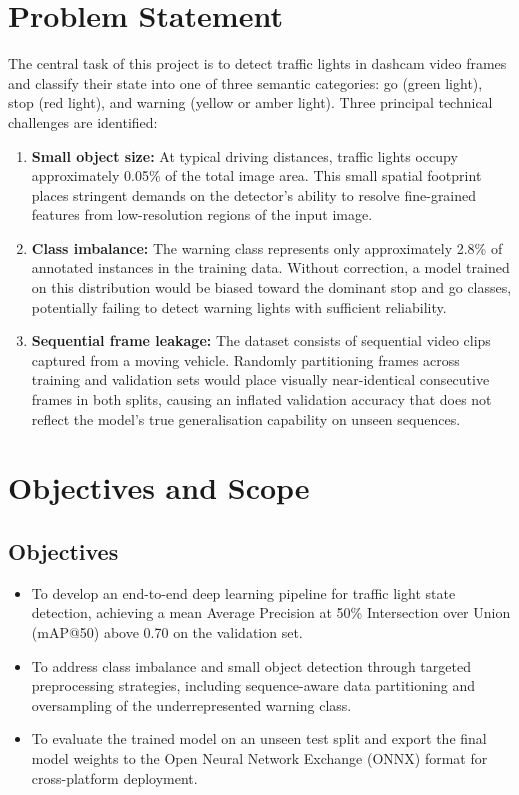 \section{Problem Statement}

The central task of this project is to detect traffic lights in dashcam video frames and classify their state into one of three semantic categories: go (green light), stop (red light), and warning (yellow or amber light). Three principal technical challenges are identified:

\begin{enumerate}
    \item \textbf{Small object size:} At typical driving distances, traffic lights occupy approximately 0.05\% of the total image area. This small spatial footprint places stringent demands on the detector's ability to resolve fine-grained features from low-resolution regions of the input image.
    \item \textbf{Class imbalance:} The warning class represents only approximately 2.8\% of annotated instances in the training data. Without correction, a model trained on this distribution would be biased toward the dominant stop and go classes, potentially failing to detect warning lights with sufficient reliability.
    \item \textbf{Sequential frame leakage:} The dataset consists of sequential video clips captured from a moving vehicle. Randomly partitioning frames across training and validation sets would place visually near-identical consecutive frames in both splits, causing an inflated validation accuracy that does not reflect the model's true generalisation capability on unseen sequences.
\end{enumerate}

\section{Objectives and Scope}

\subsection{Objectives}

\begin{itemize}
    \item To develop an end-to-end deep learning pipeline for traffic light state detection, achieving a mean Average Precision at 50\% Intersection over Union (mAP@50) above 0.70 on the validation set.
    \item To address class imbalance and small object detection through targeted preprocessing strategies, including sequence-aware data partitioning and oversampling of the underrepresented warning class.
    \item To evaluate the trained model on an unseen test split and export the final model weights to the Open Neural Network Exchange (ONNX) format for cross-platform deployment.
\end{itemize}

